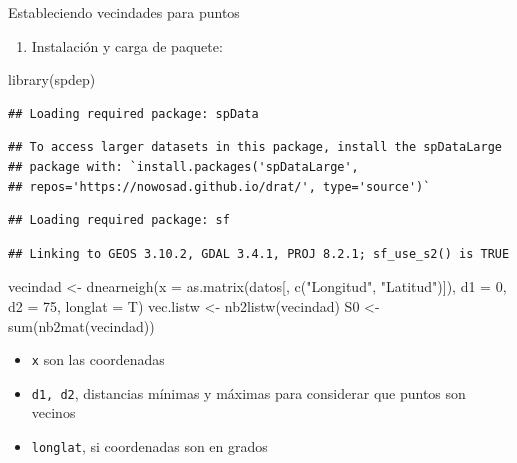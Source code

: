 \documentclass[
  11pt,
  ignorenonframetext,
]{beamer}
\newenvironment{Shaded}{}{}
\newcommand{\AttributeTok}[1]{\textcolor[rgb]{0.49,0.56,0.16}{#1}}
\newcommand{\DecValTok}[1]{\textcolor[rgb]{0.25,0.63,0.44}{#1}}
\newcommand{\FunctionTok}[1]{\textcolor[rgb]{0.02,0.16,0.49}{#1}}
\newcommand{\NormalTok}[1]{#1}
\newcommand{\OtherTok}[1]{\textcolor[rgb]{0.00,0.44,0.13}{#1}}
\newcommand{\StringTok}[1]{\textcolor[rgb]{0.25,0.44,0.63}{#1}}
\providecommand{\tightlist}{%
  \setlength{\itemsep}{0pt}\setlength{\parskip}{0pt}}
\begin{document}
\begin{frame}[fragile]{Estableciendo vecindades para puntos}
\protect\hypertarget{estableciendo-vecindades-para-puntos}{}
\begin{enumerate}
\tightlist
\item
  Instalación y carga de paquete:
\end{enumerate}

\begin{Shaded}
\begin{Highlighting}[]
\FunctionTok{library}\NormalTok{(spdep)}
\end{Highlighting}
\end{Shaded}

\begin{verbatim}
## Loading required package: spData
\end{verbatim}

\begin{verbatim}
## To access larger datasets in this package, install the spDataLarge
## package with: `install.packages('spDataLarge',
## repos='https://nowosad.github.io/drat/', type='source')`
\end{verbatim}

\begin{verbatim}
## Loading required package: sf
\end{verbatim}

\begin{verbatim}
## Linking to GEOS 3.10.2, GDAL 3.4.1, PROJ 8.2.1; sf_use_s2() is TRUE
\end{verbatim}

\begin{Shaded}
\begin{Highlighting}[]
\NormalTok{vecindad }\OtherTok{\textless{}{-}} \FunctionTok{dnearneigh}\NormalTok{(}\AttributeTok{x =} \FunctionTok{as.matrix}\NormalTok{(datos[, }\FunctionTok{c}\NormalTok{(}\StringTok{"Longitud"}\NormalTok{, }\StringTok{"Latitud"}\NormalTok{)]), }\AttributeTok{d1 =} \DecValTok{0}\NormalTok{, }\AttributeTok{d2 =} \DecValTok{75}\NormalTok{, }\AttributeTok{longlat =}\NormalTok{ T)}
\NormalTok{vec.listw }\OtherTok{\textless{}{-}} \FunctionTok{nb2listw}\NormalTok{(vecindad)}
\NormalTok{S0 }\OtherTok{\textless{}{-}} \FunctionTok{sum}\NormalTok{(}\FunctionTok{nb2mat}\NormalTok{(vecindad))}
\end{Highlighting}
\end{Shaded}

\begin{itemize}
\tightlist
\item
  \texttt{x} son las coordenadas
\item
  \texttt{d1,\ d2}, distancias mínimas y máximas para considerar que
  puntos son vecinos
\item
  \texttt{longlat}, si coordenadas son en grados
\end{itemize}
\end{frame}
\end{document}
